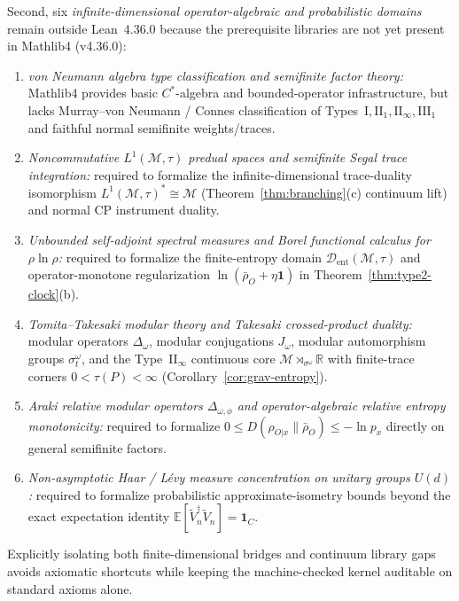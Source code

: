 \documentclass[11pt,a4paper]{article}
\theoremstyle{definition}
\theoremstyle{remark}
\newcommand{\cD}{\mathcal{D}}
\newcommand{\cM}{\mathcal{M}}
\newcommand{\bbR}{\mathbb{R}}
\newcommand{\1}{\mathbf{1}}
\newcommand{\code}[1]{{\scriptsize\ttfamily #1}}
\begin{document}
Second, six \emph{infinite-dimensional operator-algebraic and probabilistic domains} remain outside Lean~4.36.0 because the prerequisite libraries are not yet present in Mathlib4 (\code{v4.36.0}):
\begin{enumerate}
  \item \emph{von Neumann algebra type classification and semifinite factor theory:} Mathlib4 provides basic $C^*$-algebra and bounded-operator infrastructure, but lacks Murray--von Neumann / Connes classification of Types~$\mathrm{I}, \mathrm{II}_1, \mathrm{II}_\infty, \mathrm{III}_1$ and faithful normal semifinite weights/traces.
  \item \emph{Noncommutative $L^1(\cM,\tau)$ predual spaces and semifinite Segal trace integration:} required to formalize the infinite-dimensional trace-duality isomorphism $L^1(\cM,\tau)^*\cong\cM$ (Theorem~\ref{thm:branching}(c) continuum lift) and normal CP instrument duality.
  \item \emph{Unbounded self-adjoint spectral measures and Borel functional calculus for $\rho\ln\rho$:} required to formalize the finite-entropy domain $\cD_{\mathrm{ent}}(\cM,\tau)$ and operator-monotone regularization $\ln(\bar{\rho}_O+\eta\1)$ in Theorem~\ref{thm:type2-clock}(b).
  \item \emph{Tomita--Takesaki modular theory and Takesaki crossed-product duality:} modular operators $\Delta_\omega$, modular conjugations $J_\omega$, modular automorphism groups $\sigma^\omega_t$, and the Type~$\mathrm{II}_\infty$ continuous core $\cM\rtimes_{\sigma^\omega}\bbR$ with finite-trace corners $0<\tau(P)<\infty$ (Corollary~\ref{cor:grav-entropy}).
  \item \emph{Araki relative modular operators $\Delta_{\omega,\phi}$ and operator-algebraic relative entropy monotonicity:} required to formalize $0\le D(\rho_{O|x}\|\bar{\rho}_O)\le -\ln p_x$ directly on general semifinite factors.
  \item \emph{Non-asymptotic Haar / L\'evy measure concentration on unitary groups $U(d)$:} required to formalize probabilistic approximate-isometry bounds \cite{Akers2024} beyond the exact expectation identity $\mathbb{E}[\tilde{V}_n^\dagger\tilde{V}_n]=\1_C$.
\end{enumerate}
Explicitly isolating both finite-dimensional bridges and continuum library gaps avoids axiomatic shortcuts while keeping the machine-checked kernel auditable on standard axioms alone.

\end{document}
